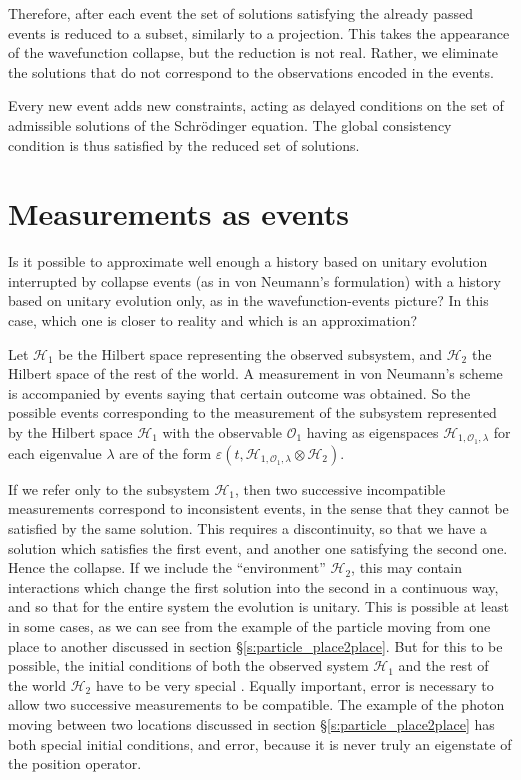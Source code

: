 \documentclass[11pt]{amsart}
\theoremstyle{definition}
\theoremstyle{plain}
\begin{document}
Therefore, after each event the set of solutions satisfying the already passed events is reduced to a subset, similarly to a projection. This takes the appearance of the wavefunction collapse, but the reduction is not real. Rather, we eliminate the solutions that do not correspond to the observations encoded in the events.

Every new event adds new constraints, acting as delayed conditions on the set of admissible solutions of the Schr\"odinger equation.
The global consistency condition is thus satisfied by the reduced set of solutions.


\section{Measurements as events}
\label{s:measurements-as-events}

Is it possible to approximate well enough a history based on unitary evolution interrupted by collapse events (as in von Neumann's formulation) with a history based on unitary evolution only, as in the wavefunction-events picture? In this case, which one is closer to reality and which is an approximation?

Let $\mathcal{H}_1$ be the Hilbert space representing the observed subsystem, and $\mathcal{H}_2$ the Hilbert space of the rest of the world.
A measurement in von Neumann's scheme is accompanied by events saying that certain outcome was obtained. So the possible events corresponding to the measurement of the subsystem represented by the Hilbert space $\mathcal{H}_1$ with the observable $\mathcal O_1$ having as eigenspaces $\mathcal{H}_{1,\mathcal O_1,\lambda}$ for each eigenvalue $\lambda$ are of the form $\varepsilon(t,\mathcal{H}_{1,\mathcal O_1,\lambda}\otimes\mathcal{H}_{2})$.

If we refer only to the subsystem $\mathcal{H}_1$, then two successive incompatible measurements correspond to inconsistent events, in the sense that they cannot be satisfied by the same solution. This requires a discontinuity, so that we have a solution which satisfies the first event, and another one satisfying the second one. Hence the collapse. If we include the ``environment'' $\mathcal{H}_2$, this may contain interactions which change the first solution into the second in a continuous way, and so that for the entire system the evolution is unitary.
This is possible at least in some cases, as we can see from the example of the particle moving from one place to another discussed in section \S\ref{s:particle_place2place}.
But for this to be possible, the initial conditions of both the observed system $\mathcal{H}_1$ and the rest of the world $\mathcal{H}_2$ have to be very special \cite{Sto12QMb}.
Equally important, error is necessary to allow two successive measurements to be compatible.
The example of the photon moving between two locations discussed in section \S\ref{s:particle_place2place} has both special initial conditions, and error, because it is never truly an eigenstate of the position operator.
\end{document}
